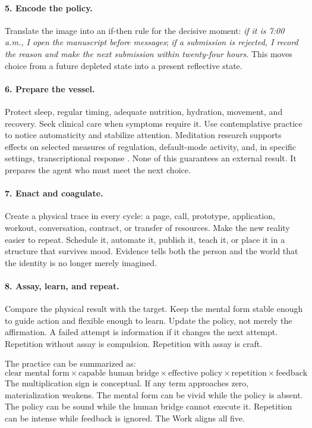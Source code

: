 \documentclass[11pt]{article}
\theoremstyle{plain}
\theoremstyle{definition}
\begin{document}
\paragraph{5. Encode the policy.}
Translate the image into an if-then rule for the decisive moment:
\emph{if it is 7:00 a.m., I open the manuscript before messages}; \emph{if a
submission is rejected, I record the reason and make the next submission within
twenty-four hours}. This moves choice from a future depleted state into a present
reflective state.

\paragraph{6. Prepare the vessel.}
Protect sleep, regular timing, adequate nutrition, hydration, movement, and recovery.
Seek clinical care when symptoms require it. Use contemplative practice to notice
automaticity and stabilize attention. Meditation research supports effects on selected
measures of regulation, default-mode activity, and, in specific settings,
transcriptional response
\citep{brewer2011meditation,vago2012sart,black2013meditation}. None of this guarantees
an external result. It prepares the agent who must meet the next choice.

\paragraph{7. Enact and coagulate.}
Create a physical trace in every cycle: a page, call, prototype, application, workout,
conversation, contract, or transfer of resources. Make the new reality easier to
repeat. Schedule it, automate it, publish it, teach it, or place it in a structure that
survives mood. Evidence tells both the person and the world that the identity is no
longer merely imagined.

\paragraph{8. Assay, learn, and repeat.}
Compare the physical result with the target. Keep the mental form stable enough to
guide action and flexible enough to learn. Update the policy, not merely the
affirmation. A failed attempt is information if it changes the next attempt.
Repetition without assay is compulsion. Repetition with assay is craft.

The practice can be summarized as:
\begin{equation}
\boxed{
\text{clear mental form}
\times
\text{capable human bridge}
\times
\text{effective policy}
\times
\text{repetition}
\times
\text{feedback}
}
\label{eq:great-work}
\end{equation}
The multiplication sign is conceptual. If any term approaches zero, materialization
weakens. The mental form can be vivid while the policy is absent. The policy can be
sound while the human bridge cannot execute it. Repetition can be intense while
feedback is ignored. The Work aligns all five.
\end{document}
